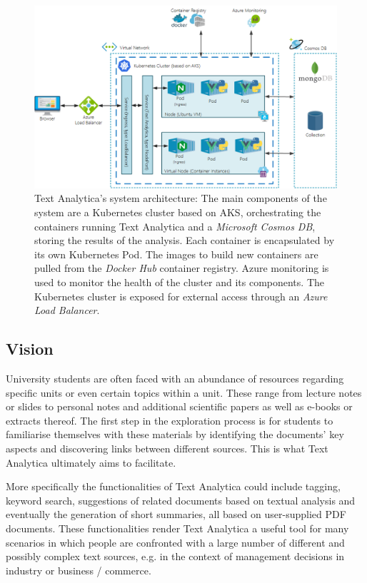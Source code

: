 \documentclass[conference]{IEEEtran}
\begin{document}
\begin{figure}[ht!]
\includegraphics[width=150mm]{img/architectur.png}
\caption{Text Analytica's system architecture: The main components of the system are a Kubernetes cluster based on AKS, orchestrating the containers running Text Analytica and a \textit{Microsoft Cosmos DB}, storing the results of the analysis. Each container is encapsulated by its own Kubernetes Pod. The images to build new containers are pulled from the \textit{Docker Hub} container registry. Azure monitoring is used to monitor the health of the cluster and its components. The Kubernetes cluster is exposed for external access through an \textit{Azure Load Balancer}.}
\label{img:architecture}
\end{figure}

\subsection{Vision}
University students are often faced with an abundance of resources regarding specific units or even certain topics within a unit. These range from lecture notes or slides to personal notes and additional scientific papers as well as e-books or extracts thereof. The first step in the exploration process is for students to familiarise themselves with these materials by identifying the documents' key aspects and discovering links between different sources. This is what Text Analytica ultimately aims to facilitate.

More specifically the functionalities of Text Analytica could include tagging, keyword search, suggestions of related documents based on textual analysis and eventually the generation of short summaries, all based on user-supplied PDF documents. These functionalities render Text Analytica a useful tool for many scenarios in which people are confronted with a large number of different and possibly complex text sources, e.g. in the context of management decisions in industry or business / commerce.
\end{document}

